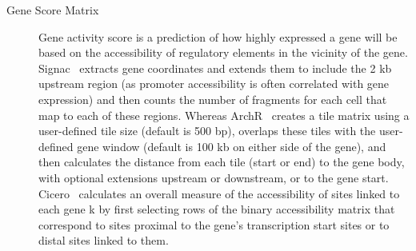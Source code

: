 \begin{description}
	\item[Gene Score Matrix]
	Gene activity score is a prediction of how highly expressed a gene will be based on the accessibility of regulatory elements in the vicinity of the gene. Signac~\citep{signac} extracts gene coordinates and extends them to include the 2 kb upstream region (as promoter accessibility is often correlated with gene expression) and then counts the number of fragments for each cell that map to each of these regions. Whereas ArchR~\citep{granja2019single} creates a tile matrix using a user-defined tile size (default is 500 bp), overlaps these tiles with the user-defined gene window (default is 100 kb on either side of the gene), and then calculates the distance from each tile (start or end) to the gene body, with optional extensions upstream or downstream, or to the gene start. Cicero~\citep{pliner2018cicero} calculates an overall measure of the accessibility of sites linked to each gene k by first selecting rows of the binary accessibility matrix that correspond to sites proximal to the gene’s transcription start sites or to distal sites linked to them.
\end{description}

